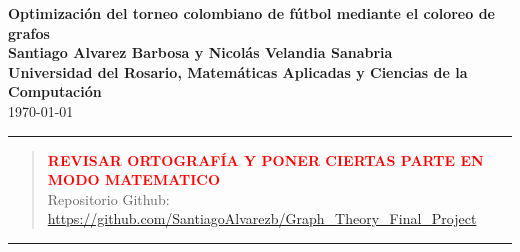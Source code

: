 \documentclass[11pt]{article}
\begin{document}
    \begin{center}
        \huge{\textbf{Optimización del torneo colombiano de fútbol mediante el coloreo de grafos}}\\[10pt]
        \small{\textbf{Santiago Alvarez Barbosa y Nicolás Velandia Sanabria}}\\[10pt]
        \small{\textbf{Universidad del Rosario, Matemáticas Aplicadas y Ciencias de la Computación}}\\[10pt]
        \today\\
        \rule{\textwidth}{0.5pt}
            \begin{abstract}
                \textcolor{red}{\textbf{\MakeUppercase{revisar ortografía y poner ciertas parte en modo matematico }}}\\
                Repositorio Github: \url{https://github.com/SantiagoAlvarezb/Graph_Theory_Final_Project}
            \end{abstract}
        \rule{\textwidth}{0.5pt}
    \end{center}
\end{document}
